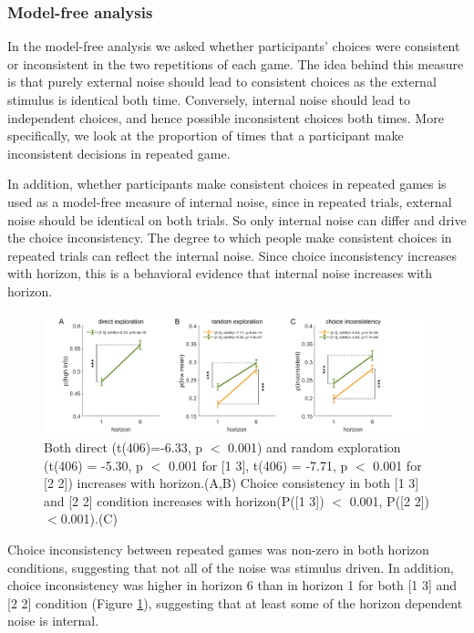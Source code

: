 \documentclass[12pt]{article}
\begin{document}
	\subsubsection*{Model-free analysis}
	
	In the model-free analysis we asked whether participants' choices were  consistent or inconsistent in the two repetitions of each game.  The idea behind this measure is that purely external noise should lead to consistent choices as the external stimulus is identical both time.  Conversely, internal noise should lead to independent choices, and hence possible inconsistent choices both times. More specifically, we look at the proportion of times that a participant make inconsistent decisions in repeated game. 
	
	In addition, whether participants make consistent choices in repeated games is used as a model-free measure of internal noise, since in repeated trials, external noise should be identical on both trials. So only internal noise can differ and drive the choice inconsistency. The degree to which people make consistent choices in repeated trials can reflect the internal noise. Since choice inconsistency increases with horizon, this is a behavioral evidence that internal noise increases with horizon.
	
	\begin{figure}[H]
		\begin{center}
			\includegraphics[width=\textwidth]{figures/Modelfree.png}
			\caption{Both direct (t(406)=-6.33, p $<$ 0.001) and random exploration (t(406) = -5.30, p $<$ 0.001 for [1 3], t(406) = -7.71, p $<$ 0.001 for [2 2]) increases with horizon.(A,B) Choice consistency in both [1 3] and [2 2] condition increases with horizon(P([1 3]) $<$ 0.001, P([2 2])$<$0.001).(C)}
			\label{fig:mf}
		\end{center}
	\end{figure}
	
	Choice inconsistency between repeated games was non-zero in both horizon conditions, suggesting that not all of the noise was stimulus driven.  In addition, choice inconsistency was higher in horizon 6 than in horizon 1 for both [1 3] and [2 2] condition (Figure \ref{fig:mf}), suggesting that at least some of the horizon dependent noise is internal.
	
\end{document}
